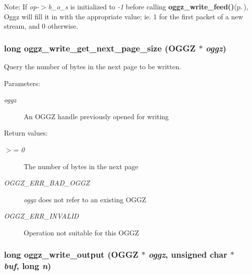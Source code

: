 \begin{Desc}
\item[Note:]If {\em op-$>$b\_\-o\_\-s\/} is initialized to {\em -1\/} before calling {\bf oggz\_\-write\_\-feed()}{\rm (p.\,\pageref{group__write__api_ga2})}, Oggz will fill it in with the appropriate value; ie. 1 for the first packet of a new stream, and 0 otherwise. \end{Desc}
\subsubsection{\setlength{\rightskip}{0pt plus 5cm}long oggz\_\-write\_\-get\_\-next\_\-page\_\-size ({\bf OGGZ} $\ast$ {\em oggz})}\label{group__write__api_ga5}


Query the number of bytes in the next page to be written. 

\begin{Desc}
\item[Parameters:]
\begin{description}
\item[{\em oggz}]An OGGZ handle previously opened for writing \end{description}
\end{Desc}
\begin{Desc}
\item[Return values:]
\begin{description}
\item[{\em $>$= 0}]The number of bytes in the next page \item[{\em OGGZ\_\-ERR\_\-BAD\_\-OGGZ}]{\em oggz\/} does not refer to an existing OGGZ \item[{\em OGGZ\_\-ERR\_\-INVALID}]Operation not suitable for this OGGZ \end{description}
\end{Desc}
\subsubsection{\setlength{\rightskip}{0pt plus 5cm}long oggz\_\-write\_\-output ({\bf OGGZ} $\ast$ {\em oggz}, unsigned char $\ast$ {\em buf}, long {\em n})}\label{group__write__api_ga3}



